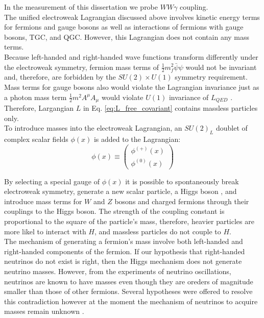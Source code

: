 In the measurement of this dissertation we probe $WW\gamma$ coupling.\\

The unified electroweak Lagrangian discussed above involves kinetic energy terms for fermions and gauge bosons as well as interactions of fermions with gauge bosons, TGC, and QGC. However, this Lagrangian does not contain any mass terms.\\

Because left-handed and right-handed wave functions transform differently under the electroweak symmetry, fermion mass terms of $\frac{1}{2} m_f^2 \bar{\psi} \psi$ would not be invariant and, therefore, are forbidden by the $SU(2) \times U(1)$ symmetry requirement. Mass terms for gauge bosons also would violate the Lagrangian invariance just as a photon mass term $\frac{1}{2} m^2 A^\mu A_\mu$ would violate $U(1)$ invariance of $L_{QED}$ \cite{ref_Griffiths}. Therefore, Largangian $L$ in Eq. \ref{eq:L_free_covariant} contains massless particles only.\\

To introduce masses into the electroweak Lagrangian, an $SU(2)_L$ doublet of complex scalar fields $\phi(x)$ is added to the Lagrangian:\\

\begin{equation}\label{eq:H_doublet}
  \phi(x) \equiv \begin{pmatrix} \phi^{(+)}(x) \\ \phi^{(0)}(x) \end{pmatrix}
\end{equation}

By selecting a special gauge of $\phi(x)$ it is possible to spontaneously break electroweak symmetry, generate a new scalar particle, a Higgs boson \cite{ref_Pich}, and introduce mass terms for $W$ and $Z$ bosons and charged fermions through their couplings to the Higgs boson. The strength of the coupling constant is proportional to the square of the particle's mass, therefore, heavier particles are more likel to interact with $H$, and massless particles do not couple to $H$.\\

The mechanism of generating a fermion's mass involve both left-handed and right-handed components of the fermion. If our hypothesis that right-handed neutrinos do not exist is right, then the Higgs mechanism does not generate neutrino masses. However, from the experiments of neutrino oscillations, neutrinos are known to have masses even though they are oreders of magnitude smaller than those of other fermions. Several hypotheses were offered to resolve this contradiction however at the moment the mechanism of neutrinos to acquire masses remain unknown \cite{ref_PDG}.\\

